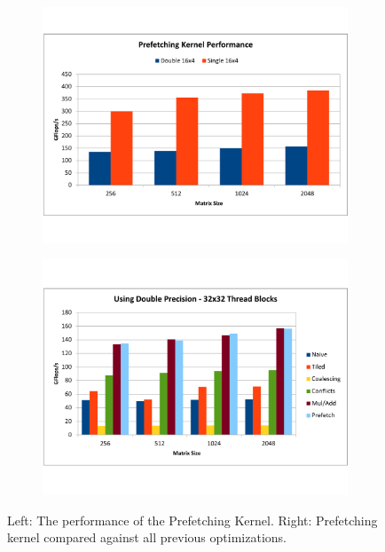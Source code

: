 \documentclass[paper=a4, fontsize=11pt]{scrartcl} %
\numberwithin{equation}{section} %
\numberwithin{figure}{section} %
\numberwithin{table}{section} %
\begin{document}
\begin{figure} [h]
\centering
\begin{subfigure}{.5\textwidth}
  \centering
  \includegraphics[width=\linewidth]{figures/prefetch.pdf}
  \label{fig:prefetch}
\end{subfigure}%
\begin{subfigure}{.5\textwidth}
  \centering
  \includegraphics[width=\linewidth]{figures/prefetch_vs_outer.pdf}
  \label{fig:prefetch_vs_balancing}
\end{subfigure}
\caption{Left: The performance of the Prefetching Kernel. Right: Prefetching kernel compared against all previous optimizations.}
\label{fig:multi7}
\end{figure}
\end{document}
